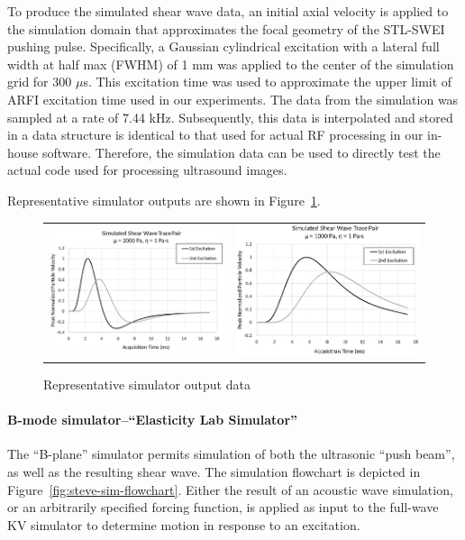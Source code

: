 To produce the simulated shear wave data, an initial axial velocity is applied
to the simulation domain that approximates the focal geometry of the STL-SWEI
pushing pulse. Specifically, a Gaussian cylindrical excitation with a lateral
full width at half max (FWHM) of 1 mm was applied to the center of the
simulation grid for 300 $\mu$s. This excitation time was used to approximate the
upper limit of ARFI excitation time used in our experiments. The data from the
simulation was sampled at a rate of 7.44 kHz. Subsequently, this data is
interpolated and stored in a data structure is identical to that used for
actual RF processing in our in-house software. Therefore, the simulation data
can be used to directly test the actual code used for processing ultrasound
images. 

Representative simulator outputs are shown in Figure~\ref{fig:steve-representative-output}.

\begin{figure}[htb!]
    \centering
    \begin{tabular}{cc}
        \includegraphics[width=0.45\linewidth]{steve/figs/image1.png} &
        \includegraphics[width=0.45\linewidth]{steve/figs/image2.png} \\
    \end{tabular}
    \caption{Representative simulator output data} 
\label{fig:steve-representative-output}
\end{figure}

\paragraph{B-mode simulator--``Elasticity Lab Simulator''}
The ``B-plane'' simulator permits simulation of both the ultrasonic ``push
beam'', as well as the resulting shear wave. The simulation flowchart is
depicted in Figure~\ref{fig:steve-sim-flowchart}. Either the result of an
acoustic wave simulation, or an arbitrarily specified forcing function, is
applied as input to the full-wave KV simulator to determine motion in response
to an excitation. 

